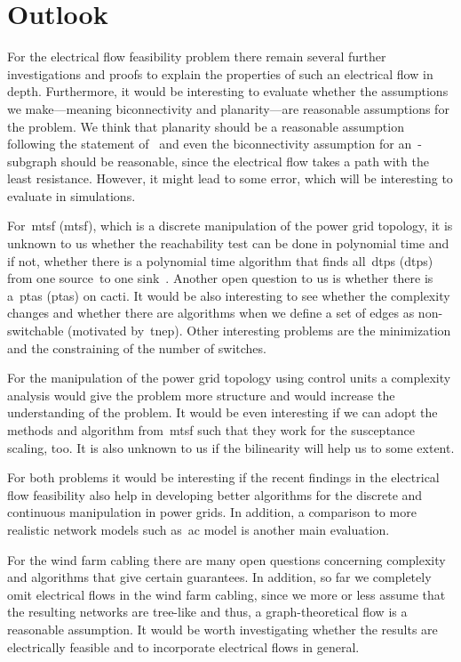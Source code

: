 \section{Outlook}\label{ch:conclusion:sec:outlook}

For the electrical flow feasibility problem there remain several further
investigations and proofs to explain the properties of such an electrical flow
in depth. Furthermore, it would be interesting to evaluate whether the
assumptions we make---meaning biconnectivity and planarity---are reasonable
assumptions for the problem. We think that planarity should be a reasonable
assumption following the statement of~\textcite[p.13]{Cai12} and even the
biconnectivity assumption for an~\source-\sink subgraph should be reasonable,
since the electrical flow takes a path with the least resistance. However, it
might lead to some error, which will be interesting to evaluate in simulations.

For~\acrlong{mtsf} (\gls{mtsf}), which is a discrete manipulation of the power
grid topology, it is unknown to us whether the reachability test can be done in
polynomial time and if not, whether there is a polynomial time algorithm that
finds all~\acrlong{dtp}s (\gls{dtp}s) from one source~\source to one sink~\sink.
Another open question to us is whether there is a~\acrlong{ptas} (\gls{ptas}) on
cacti. It would be also interesting to see whether the complexity changes and
whether there are algorithms when we define a set of edges as non-switchable
(motivated by~\gls{tnep}). Other interesting problems are the minimization and
the constraining of the number of switches.

For the manipulation of the power grid topology using control units a complexity
analysis would give the problem more structure and would increase the
understanding of the problem. It would be even interesting if we can adopt the
methods and algorithm from~\gls{mtsf} such that they work for the susceptance
scaling, too. It is also unknown to us if the bilinearity will help us to some
extent.

For both problems it would be interesting if the recent findings in the
electrical flow feasibility also help in developing better algorithms for the
discrete and continuous manipulation in power grids. In addition, a comparison
to more realistic network models such as~\gls{ac} model is another main
evaluation.

For the wind farm cabling there are many open questions concerning complexity
and algorithms that give certain guarantees. In addition, so far we completely
omit electrical flows in the wind farm cabling, since we more or less assume
that the resulting networks are tree-like and thus, a graph-theoretical flow is
a reasonable assumption. It would be worth investigating whether the results are
electrically feasible and to incorporate electrical flows in general.
% 